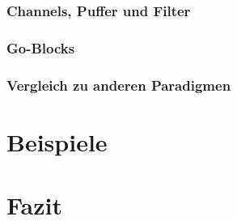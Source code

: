 \documentclass[a4paper,12pt,numbers=noenddot, chapteratlists=0pt]{scrreprt}
\begin{document}
\subsection*{Channels, Puffer und Filter}
\subsection*{Go-Blocks}
\subsection*{Vergleich zu anderen Paradigmen}
\chapter{Beispiele}
\chapter{Fazit}
\end{document}
